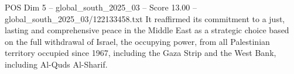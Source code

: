 \begin{textsample}{POS Dim 5 – global\_south\_2025\_03 – Score 13.00 – global\_south\_2025\_03/122133458.txt}
It reaffirmed its commitment to a just, lasting and comprehensive peace in the Middle East as a strategic choice based on the full withdrawal of Israel, the occupying power, from all Palestinian territory occupied since 1967, including the Gaza Strip and the West Bank, including Al-Quds Al-Sharif.

\end{textsample}
